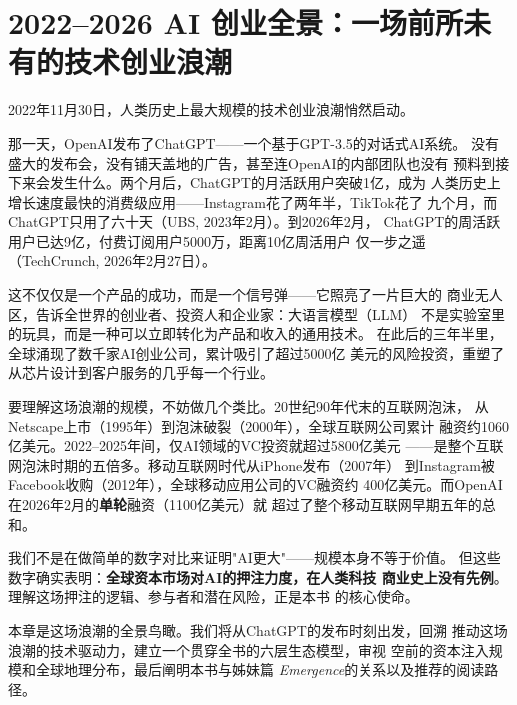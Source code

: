 
\chapter{2022--2026 AI 创业全景：一场前所未有的技术创业浪潮}
\label{ch:overview}


2022年11月30日，人类历史上最大规模的技术创业浪潮悄然启动。

那一天，OpenAI发布了ChatGPT——一个基于GPT-3.5的对话式AI系统。
没有盛大的发布会，没有铺天盖地的广告，甚至连OpenAI的内部团队也没有
预料到接下来会发生什么。两个月后，ChatGPT的月活跃用户突破1亿，成为
人类历史上增长速度最快的消费级应用——Instagram花了两年半，TikTok花了
九个月，而ChatGPT只用了六十天（UBS, 2023年2月）。到2026年2月，
ChatGPT的周活跃用户已达9亿，付费订阅用户5000万，距离10亿周活用户
仅一步之遥（TechCrunch, 2026年2月27日）。

这不仅仅是一个产品的成功，而是一个信号弹——它照亮了一片巨大的
商业无人区，告诉全世界的创业者、投资人和企业家：大语言模型（LLM）
不是实验室里的玩具，而是一种可以立即转化为产品和收入的通用技术。
在此后的三年半里，全球涌现了数千家AI创业公司，累计吸引了超过5000亿
美元的风险投资，重塑了从芯片设计到客户服务的几乎每一个行业。

要理解这场浪潮的规模，不妨做几个类比。20世纪90年代末的互联网泡沫，
从Netscape上市（1995年）到泡沫破裂（2000年），全球互联网公司累计
融资约1060亿美元。2022--2025年间，仅AI领域的VC投资就超过5800亿美元
——是整个互联网泡沫时期的五倍多。移动互联网时代从iPhone发布（2007年）
到Instagram被Facebook收购（2012年），全球移动应用公司的VC融资约
400亿美元。而OpenAI在2026年2月的\textbf{单轮}融资（1100亿美元）就
超过了整个移动互联网早期五年的总和。

我们不是在做简单的数字对比来证明"AI更大"——规模本身不等于价值。
但这些数字确实表明：\textbf{全球资本市场对AI的押注力度，在人类科技
商业史上没有先例}。理解这场押注的逻辑、参与者和潜在风险，正是本书
的核心使命。

本章是这场浪潮的全景鸟瞰。我们将从ChatGPT的发布时刻出发，回溯
推动这场浪潮的技术驱动力，建立一个贯穿全书的六层生态模型，审视
空前的资本注入规模和全球地理分布，最后阐明本书与姊妹篇
\textit{Emergence}的关系以及推荐的阅读路径。


